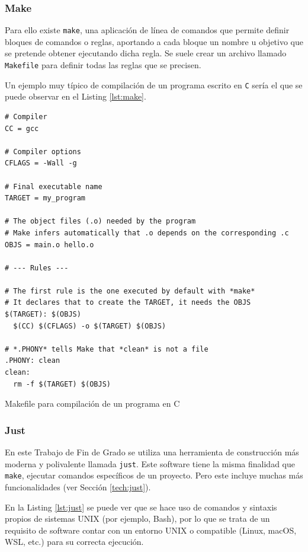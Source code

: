 \subsubsection*{Make}
\label{subsec:make}

Para ello existe \texttt{make}\cite{make}, una aplicación de línea de comandos que permite definir bloques de comandos o reglas, aportando a cada bloque un nombre u objetivo que se pretende obtener ejecutando dicha regla. Se suele crear un archivo llamado \texttt{Makefile} para definir todas las reglas que se precisen.

Un ejemplo muy típico de compilación de un programa escrito en \texttt{C} sería el que se puede observar en el Listing \ref{lst:make}.

\begin{listing}[!ht]
  \begin{verbatim}
# Compiler
CC = gcc

# Compiler options
CFLAGS = -Wall -g

# Final executable name
TARGET = my_program

# The object files (.o) needed by the program
# Make infers automatically that .o depends on the corresponding .c
OBJS = main.o hello.o

# --- Rules ---

# The first rule is the one executed by default with *make*
# It declares that to create the TARGET, it needs the OBJS
$(TARGET): $(OBJS)
  $(CC) $(CFLAGS) -o $(TARGET) $(OBJS)

# *.PHONY* tells Make that *clean* is not a file
.PHONY: clean
clean:
  rm -f $(TARGET) $(OBJS)
\end{verbatim}
\caption{Makefile para compilación de un programa en C}
\label{lst:make}
\end{listing}

\subsubsection*{Just}
\label{subsec:just}

En este Trabajo de Fin de Grado se utiliza una herramienta de construcción más moderna y polivalente llamada \texttt{just}\cite{just}. Este software tiene la misma finalidad que \texttt{make}, ejecutar comandos específicos de un proyecto. Pero este incluye muchas más funcionalidades (ver Sección \ref{tech:just}).

En la Listing \ref{lst:just} se puede ver que se hace uso de comandos y sintaxis propios de sistemas UNIX (por ejemplo, Bash), por lo que se trata de un requisito de software contar con un entorno UNIX o compatible (Linux, macOS, WSL, etc.) para su correcta ejecución.

